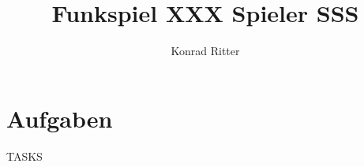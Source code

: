 \documentclass[12pt,a4paper]{scrreport}
\author{Konrad Ritter}
\title{Funkspiel XXX Spieler SSS}
\begin{document}
\maketitle
\tableofcontents
\section{Aufgaben}
TASKS
\end{document}
